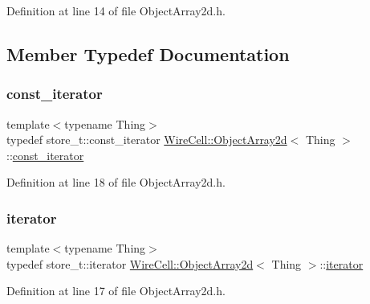 Definition at line 14 of file Object\+Array2d.\+h.



\subsection{Member Typedef Documentation}
\mbox{\label{class_wire_cell_1_1_object_array2d_a4ac09025b41a1ab92f472eeae2cc0352}} 
\subsubsection{\texorpdfstring{const\+\_\+iterator}{const\_iterator}}
{\footnotesize\ttfamily template$<$typename Thing$>$ \\
typedef store\+\_\+t\+::const\+\_\+iterator \hyperlink{class_wire_cell_1_1_object_array2d}{Wire\+Cell\+::\+Object\+Array2d}$<$ Thing $>$\+::\hyperlink{class_wire_cell_1_1_object_array2d_a4ac09025b41a1ab92f472eeae2cc0352}{const\+\_\+iterator}}



Definition at line 18 of file Object\+Array2d.\+h.

\mbox{\label{class_wire_cell_1_1_object_array2d_a08055a2eb80a3d4de9dcd72e5da07227}} 
\subsubsection{\texorpdfstring{iterator}{iterator}}
{\footnotesize\ttfamily template$<$typename Thing$>$ \\
typedef store\+\_\+t\+::iterator \hyperlink{class_wire_cell_1_1_object_array2d}{Wire\+Cell\+::\+Object\+Array2d}$<$ Thing $>$\+::\hyperlink{class_wire_cell_1_1_object_array2d_a08055a2eb80a3d4de9dcd72e5da07227}{iterator}}



Definition at line 17 of file Object\+Array2d.\+h.

\mbox{\label{class_wire_cell_1_1_object_array2d_af40c546ff8c0417e73454fe88360d690}} 
